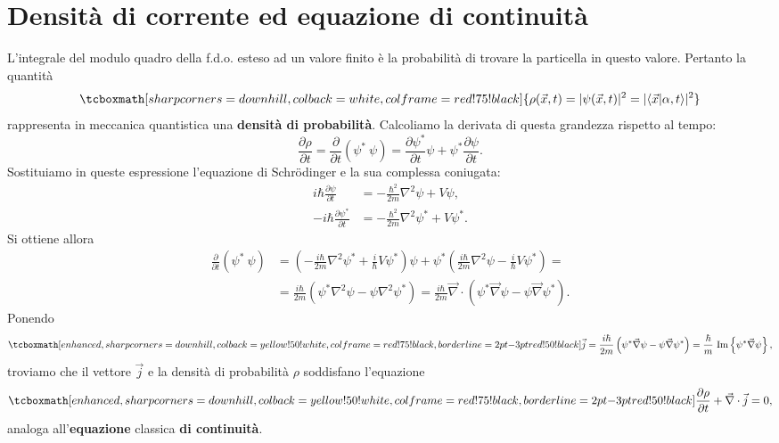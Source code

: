 \documentclass[a4paper,12pt,oneside]{book}
\begin{document}
\section[Densità di corrente ed equazione di continuità]{Densità di corrente ed equazione di continuità}
L'integrale del modulo quadro della f.d.o. esteso ad un valore finito è la probabilità di trovare la particella in questo valore. Pertanto la quantità
	\begin{equation}
		\tcboxmath[sharp corners=downhill, colback=white, colframe=red!75!black]{
			\rho (\vec{x}, t) = \vert \psi (\vec{x},t) \vert ^2 = \vert \langle \vec{x}\vert \alpha, t \rangle \vert ^2
				}
	\end{equation}
rappresenta in meccanica quantistica una \textbf{densità di probabilità}. Calcoliamo la derivata di questa grandezza rispetto al tempo:
	\begin{equation}
		\frac{\partial \rho}{\partial t} = \frac{\partial }{\partial t}\left( \psi^*\ \psi \right) = \frac{\partial \psi ^*}{\partial t}\psi + \psi^*\frac{\partial \psi}{\partial t}.
	\end{equation}
Sostituiamo in queste espressione l'equazione di Schr\"{o}dinger e la sua complessa coniugata:
	\begin{align}
	 	i\hbar \frac{\partial \psi}{\partial t} &= -\frac{\hbar ^2}{2m} \nabla ^ 2 \psi + V \psi ,\\[0.5cm]
		 -i\hbar \frac{\partial \psi ^*}{\partial t} &= -\frac{\hbar ^2}{2m} \nabla ^ 2 \psi ^* + V \psi ^* .
	\end{align}
Si ottiene allora
	\begin{align}
		\frac{\partial }{\partial t}\left(\psi^*\ \psi \right) & =  \left(-\frac{i\hbar}{2m}\nabla ^2 \psi ^* +\frac{i}{\hbar}V\psi ^*\right)\psi +  \psi ^* \left(\frac{i\hbar}{2m}\nabla ^2 \psi -\frac{i}{\hbar}V\psi ^*\right)= \nonumber\\[0.3cm]
		&=  \frac{i\hbar}{2m}\left(\psi ^* \nabla ^2 \psi - \psi \nabla ^2 \psi ^* \right) =  \frac{i\hbar}{2m} \vec{\nabla}\cdot \left(\psi ^* \vec{\nabla} \psi - \psi \vec{\nabla} \psi ^* \right). 
	\end{align}
Ponendo
	\begin{equation}
		\tcboxmath[enhanced, sharp corners=downhill, colback=yellow!50!white, colframe=red!75!black, borderline={2pt}{-3pt}{red!50!black}]{
			\vec{j}=\frac{i\hbar}{2m} \left(\psi ^* \vec{\nabla} \psi - \psi \vec{\nabla} \psi ^* \right)= \frac{\hbar}{m}\ \textrm{Im}\left\{\psi ^* \vec{\nabla}\psi \right\},
			}
	\end{equation}
troviamo che il vettore $\vec{j}$ e la densità di probabilità $\rho$ soddisfano l'equazione
	\begin{equation}
		\tcboxmath[enhanced, sharp corners=downhill, colback=yellow!50!white, colframe=red!75!black, borderline={2pt}{-3pt}{red!50!black}]{
			\frac{\partial \rho}{\partial t}+ \vec{\nabla}\cdot\vec{j}=0,
				}
	\end{equation}
analoga all'\textbf{equazione} classica \textbf{di continuità}.\\
\end{document}
